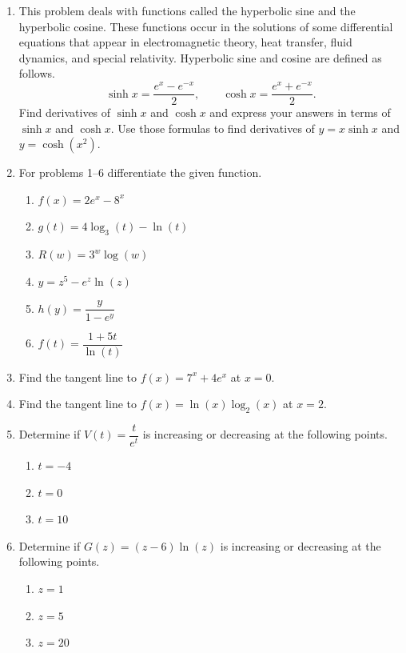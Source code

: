 \begin{enumerate}
\item This problem deals with functions called the hyperbolic sine and the hyperbolic cosine. These functions occur in the solutions of some differential equations that appear in electromagnetic theory, heat transfer, fluid dynamics, and special relativity. Hyperbolic sine and cosine are defined as follows.
  \[
  \sinh x=\frac{e^{x}-e^{-x}}{2}, \qquad \cosh x=\frac{e^{x}+e^{-x}}{2}.
  \]
  Find derivatives of $\sinh x$ and $\cosh x$ and express your answers in terms of $\sinh x$ and $\cosh x$. Use those formulas to find derivatives of $y=x\sinh x$ and $y=\cosh\left(x^{2}\right)$.


\item For problems 1--6 differentiate the given function.
  \begin{enumerate}
    \item $f(x)=2e^x-8^x$ 
    \item $g(t)=4\log_{3}(t)-\ln(t)$ 
    \item $R(w)=3^w\log(w)$ 
    \item $y=z^5-e^z\ln(z)$ 
    \item $h(y)=\dfrac{y}{1-e^y}$ 
    \item $f(t)=\dfrac{1+5t}{\ln(t)}$ 
  \end{enumerate}

\item Find the tangent line to $f(x)=7^x+4e^x$ at $x=0$. 

\item Find the tangent line to $f(x)=\ln(x)\log_{2}(x)$ at $x=2$. 

\item Determine if $V(t)=\dfrac{t}{e^t}$ is increasing or decreasing at the following points.
  \begin{enumerate}
    \item $t=-4$ 
    \item $t=0$ 
    \item $t=10$ 
  \end{enumerate}

\item Determine if $G(z)=(z-6)\ln(z)$ is increasing or decreasing at the following points.
  \begin{enumerate}
    \item $z=1$ 
    \item $z=5$ 
    \item $z=20$ 
  \end{enumerate}

\end{enumerate}


